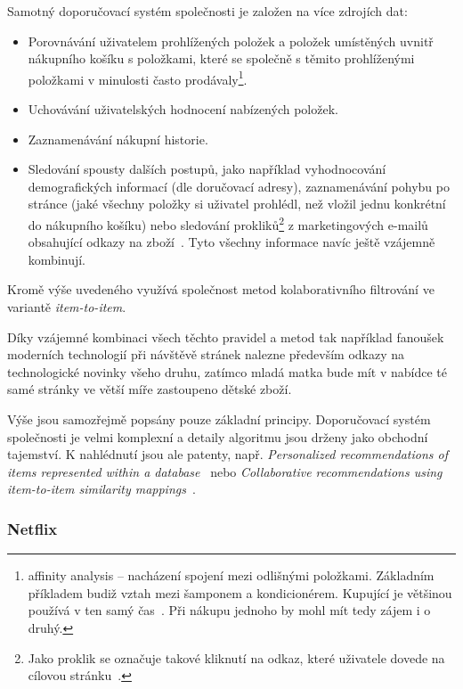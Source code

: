 \documentclass[thesis=M,czech]{FITthesis}[2014/05/07]
\begin{document}
Samotný doporučovací systém společnosti je založen na více zdrojích dat:

\begin{itemize}
	\item Porovnávání uživatelem prohlížených položek a položek umístěných uvnitř nákupního košíku s položkami, které se společně s těmito prohlíženými položkami v minulosti často prodávaly\footnote{affinity analysis – nacházení spojení mezi odlišnými položkami. Základním příkladem budiž vztah mezi šamponem a kondicionérem. Kupující je většinou používá v ten samý čas~\cite{affinity}. Při nákupu jednoho by mohl mít tedy zájem i o druhý.}.
	\item Uchovávání uživatelských hodnocení nabízených položek.
	\item Zaznamenávání nákupní historie.
	\item Sledování spousty dalších postupů, jako například vyhodnocování demografických informací (dle doručovací adresy), zaznamenávání pohybu po stránce (jaké všechny položky si uživatel prohlédl, než vložil jednu konkrétní do nákupního košíku) nebo sledování prokliků\footnote{Jako proklik se označuje takové kliknutí na odkaz, které uživatele dovede na cílovou stránku~\cite{proklik}.} z marketingových e-mailů obsahující odkazy na zboží~\cite{amazonrec}. Tyto všechny informace navíc ještě vzájemně kombinují.
\end{itemize}

Kromě výše uvedeného využívá společnost metod kolaborativního filtrování ve variantě \emph{item-to-item}.

Díky vzájemné kombinaci všech těchto pravidel a metod tak například fanoušek moderních technologií při návštěvě stránek nalezne především odkazy na technologické novinky všeho druhu, zatímco mladá matka bude mít v nabídce té samé stránky ve větší míře zastoupeno dětské zboží.
 
Výše jsou samozřejmě popsány pouze základní principy. Doporučovací systém společnosti je velmi komplexní a detaily algoritmu jsou drženy jako obchodní tajemství. K nahlédnutí jsou ale patenty, např. \emph{Personalized recommendations of items represented within a database}~\cite{jacobi2006personalized} nebo \emph{Collaborative recommendations using item-to-item similarity mappings}~\cite{linden2001collaborative}.

\subsubsection{Netflix}
\end{document}
